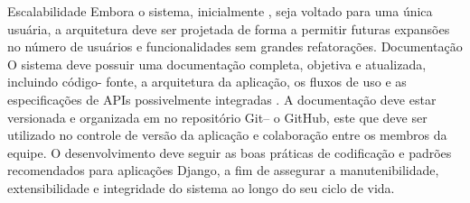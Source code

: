 	Escalabilidade
	Embora o sistema, inicialmente , seja voltado para uma única usuária, a arquitetura deve ser projetada de forma a permitir futuras expansões no número de usuários e funcionalidades sem grandes refatorações.
	Documentação
	O sistema deve possuir uma documentação completa, objetiva e atualizada, incluindo código- fonte, a arquitetura da aplicação, os fluxos de uso e as especificações de APIs possivelmente integradas . 
	A documentação deve estar versionada e organizada em no repositório Git– o GitHub, este que deve ser utilizado no controle de versão da aplicação  e colaboração entre os membros da equipe. 
	O desenvolvimento deve seguir as boas práticas de codificação e padrões recomendados para aplicações Django, a fim de assegurar a manutenibilidade, extensibilidade e integridade do sistema ao longo do seu ciclo de vida.
	